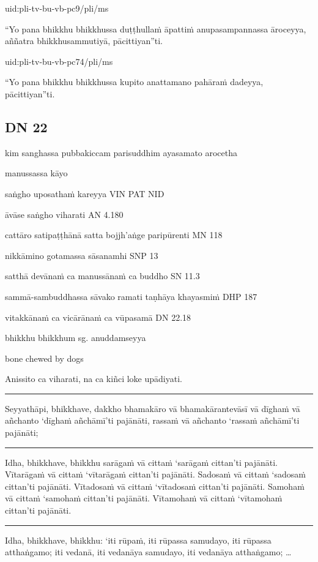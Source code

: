 \documentclass[11pt,oneside]{memoir}
\begin{document}
uid:pli-tv-bu-vb-pc9/pli/ms

“Yo pana bhikkhu bhikkhussa duṭṭhullaṁ āpattiṁ anupasampannassa āroceyya, aññatra bhikkhusammutiyā, pācittiyan”ti.

uid:pli-tv-bu-vb-pc74/pli/ms

“Yo pana bhikkhu bhikkhussa kupito anattamano pahāraṁ dadeyya, pācittiyan”ti.

\subsection{DN 22}
\label{sec:orgbb8f813}

kim sanghassa pubbakiccam
parisuddhim ayasamato arocetha

manussassa kāyo

saṅgho uposathaṁ kareyya VIN PAT NID

āvāse saṅgho viharati AN 4.180

cattāro satipaṭṭhānā satta bojjh'aṅge paripūrenti MN 118

nikkāmino gotamassa sāsanamhi SNP 13

satthā devānaṁ ca manussānaṁ ca buddho SN 11.3

sammā-sambuddhassa sāvako ramati taṇhāya khayasmiṁ DHP 187

vitakkānaṁ ca vicārānaṁ ca vūpasamā DN 22.18


bhikkhu bhikkhum sg. anuddamseyya

bone chewed by dogs

Anissito ca viharati, na ca kiñci loke upādiyati.

\noindent\rule{\textwidth}{0.5pt}

Seyyathāpi, bhikkhave, dakkho bhamakāro vā bhamakārantevāsī vā dīghaṁ vā
añchanto ‘dīghaṁ añchāmī’ti pajānāti, rassaṁ vā añchanto ‘rassaṁ añchāmī’ti
pajānāti;

\noindent\rule{\textwidth}{0.5pt}

Idha, bhikkhave, bhikkhu sarāgaṁ vā cittaṁ ‘sarāgaṁ cittan’ti pajānāti.
Vītarāgaṁ vā cittaṁ ‘vītarāgaṁ cittan’ti pajānāti. Sadosaṁ vā cittaṁ ‘sadosaṁ
cittan’ti pajānāti. Vītadosaṁ vā cittaṁ ‘vītadosaṁ cittan’ti pajānāti. Samohaṁ
vā cittaṁ ‘samohaṁ cittan’ti pajānāti. Vītamohaṁ vā cittaṁ ‘vītamohaṁ cittan’ti
pajānāti.

\noindent\rule{\textwidth}{0.5pt}

Idha, bhikkhave, bhikkhu: ‘iti rūpaṁ, iti rūpassa samudayo, iti rūpassa
atthaṅgamo; iti vedanā, iti vedanāya samudayo, iti vedanāya atthaṅgamo; \ldots{}
\end{document}
